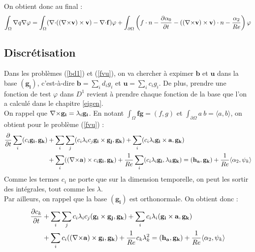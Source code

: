 
On obtient donc au final :
\begin{eqnarray}
\label{fvq}
\int_\Omega {\nabla} q{\nabla}\varphi = \int_\Omega ({\nabla\cdot}(({\nabla\times} \mathbf{v})\times \mathbf{v}) -{\nabla\cdot} \mathbf{f})\varphi + \int_{\partial\Omega} \left(f\cdot n - \frac{\partial\alpha_0}{\partial t} - (({\nabla\times} \mathbf{v})\times \mathbf{v})\cdot n - \frac{\alpha_2}{Re}\right)\varphi
\end{eqnarray}

\subsection{Discrétisation}
\label{discr}

Dans les problèmes (\ref{bd1}) et (\ref{fvu}), on va chercher à expimer $\mathbf{b}$ et $\mathbf{u}$ dans la base $(\mathbf{g_i})$, c'est-à-dire $\mathbf{b}=\sum_i d_ig_i$ et $\mathbf{u}=\sum_i c_ig_i$. De plus, prendre une fonction de test $\varphi$ dans $D^1$ revient à prendre chaque fonction de la base que l'on a calculé dans le chapitre \ref{eigen}.\\
On rappel que ${\nabla\times} \mathbf{g_i}=\lambda_i\mathbf{g_i}$. En notant $\int_\Omega \mathbf{f}\mathbf{g}=(f,g)$ et $\int_{\partial\Omega}a\ b=\langle a,b\rangle$, on obtient pour le problème (\ref{fvu}) :
\begin{align*}
\frac{\partial}{\partial t}\sum_i (c_i\mathbf{g_i}, \mathbf{g_k}) &+ \sum_i\sum_j (c_i\lambda_ic_j\mathbf{g_i}\times \mathbf{g_j},\mathbf{g_k}) + \sum_i(c_i\lambda_i\mathbf{g_i}\times \mathbf{a},\mathbf{g_k})\\
&+ \sum_i (({\nabla\times} \mathbf{a})\times c_i\mathbf{g_i},\mathbf{g_k}) + \frac{1}{Re}\sum_i(c_i\lambda_i\mathbf{g_i}, \lambda_k\mathbf{g_k}) = (\mathbf{h_a},\mathbf{g_k}) + \frac{1}{Re}\langle\alpha_2,\psi_k\rangle
\end{align*}
Comme les termes $c_i$ ne porte que sur la dimension temporelle, on peut les
sortir des intégrales, tout comme les $\lambda$.\\

Par ailleurs, on rappel que la base $(\mathbf{g_i})$ est orthonormale. On obtient donc :
\begin{equation}
\label{fvspec}
\begin{aligned}
\frac{\partial c_k}{\partial t} &+ \sum_i\sum_j c_i\lambda_i c_j(\mathbf{g_i}\times \mathbf{g_j}, \mathbf{g_k}) + \sum_i c_i\lambda_i(\mathbf{g_i}\times \mathbf{a},\mathbf{g_k})\\
&+ \sum_i c_i(({\nabla\times} \mathbf{a})\times \mathbf{g_i}, \mathbf{g_k}) + \frac{1}{Re}c_k\lambda_k^2 = (\mathbf{h_a},\mathbf{g_k}) + \frac{1}{Re}\langle\alpha_2,\psi_k\rangle
\end{aligned}
\end{equation}

